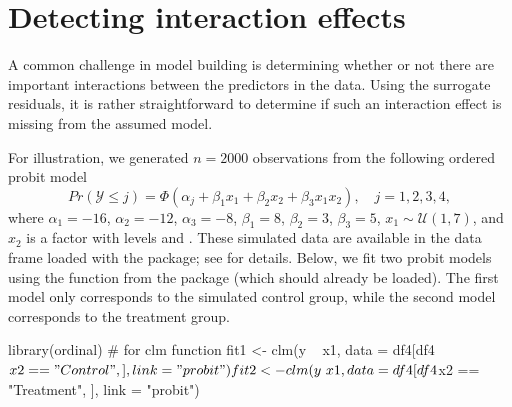 \section{Detecting interaction effects}

A common challenge in model building is determining whether or not there are important interactions between the predictors in the data. Using the surrogate residuals, it is rather straightforward to determine if such an interaction effect is missing from the assumed model.

For illustration, we generated $n = 2000$ observations from the following ordered probit model
\begin{equation*}
  Pr\left(\mathcal{Y} \le j\right) = \Phi\left(\alpha_j + \beta_1 x_1 + \beta_2 x_2 + \beta_3 x_1 x_2\right), \quad j = 1, 2, 3, 4,
\end{equation*}
where $\alpha_1 = -16$, $\alpha_2 = -12$, $\alpha_3 = -8$, $\beta_1 = 8$, $\beta_2 = 3$, $\beta_3 = 5$, $x_1 \sim \mathcal{U}\left(1, 7\right)$, and $x_2$ is a factor with levels  and . These simulated data are available in the  data frame loaded with the  package; see  for details. Below, we fit two probit models using the  function from the  package (which should already be loaded). The first model only corresponds to the simulated control group, while the second model corresponds to the treatment group.
\begin{example}
library(ordinal)  # for clm function
fit1 <- clm(y ~ x1, data = df4[df4$x2 == "Control", ], link = "probit")
fit2 <- clm(y ~ x1, data = df4[df4$x2 == "Treatment", ], link = "probit")
\end{example}

